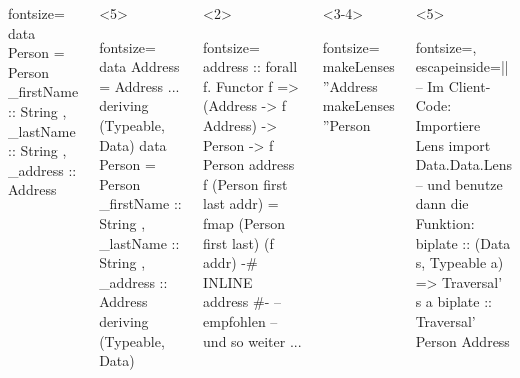 \documentclass{beamer}
\begin{document}
\begin{frame}[fragile,t]
\begin{columns}[t]
\begin{onlyenv}
\begin{haskellcode*}{fontsize=\small}
data Person = Person
  { _firstName :: String
  , _lastName :: String
  , _address :: Address
  }
\end{haskellcode*}
    \end{onlyenv}
    \begin{onlyenv}<5>
\begin{haskellcode*}{fontsize=\small}
data Address = Address {...}
  deriving (Typeable, Data)
data Person = Person
  { _firstName :: String
  , _lastName :: String
  , _address :: Address
  } deriving (Typeable, Data)
\end{haskellcode*}
    \end{onlyenv}
    \begin{onlyenv}<2>
\begin{haskellcode*}{fontsize=\small}
address :: forall f. Functor f
        => (Address -> f Address)
        -> Person -> f Person
address f (Person first last addr) =
  fmap (Person first last) (f addr)
{-# INLINE address #-} -- empfohlen
-- und so weiter ...
\end{haskellcode*}
    \end{onlyenv}
    \begin{onlyenv}<3-4>
\begin{haskellcode*}{fontsize=\small}
makeLenses ''Address
makeLenses ''Person
\end{haskellcode*}
    \end{onlyenv}
    \begin{onlyenv}<5>
      \vspace{1em}
\begin{haskellcode*}{fontsize=\footnotesize, escapeinside=||}
-- Im Client-Code: Importiere Lens
import Data.Data.Lens
-- und benutze dann die Funktion:
biplate :: (Data s, Typeable a)
        => Traversal' s a
biplate :: Traversal' Person Address
\end{haskellcode*}
    \end{onlyenv}


\end{columns}
\end{frame}
\end{document}
